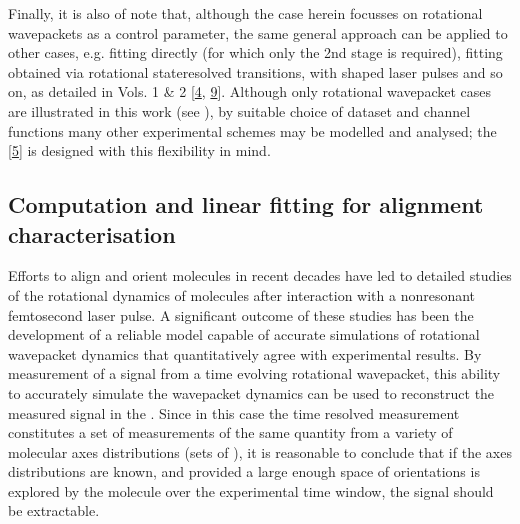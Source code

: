 \documentclass[letterpaper,table,10pt,english]{jupyterBook}
\begin{document}
\sphinxAtStartPar
Finally, it is also of note that, although the case herein focusses on rotational wavepackets as a control parameter, the same general approach can be applied to other cases, e.g. fitting {\hyperref[\detokenize{backmatter/glossary:term-MF}]{}} directly (for which only the 2nd stage is required), fitting {\hyperref[\detokenize{backmatter/glossary:term-PADs}]{}} obtained via rotational state\sphinxhyphen{}resolved transitions, with shaped laser pulses and so on, as detailed in  Vols. 1 \& 2 {[}\hyperlink{cite.backmatter/bibliography:id675}{4}, \hyperlink{cite.backmatter/bibliography:id676}{9}{]}. Although only rotational wavepacket cases are illustrated in this work (see {\hyperref[\detokenize{part2/extracting_matrix_elements_overview_270423:chpt-extracting-matrix-elements-overview}]{}}), by suitable choice of dataset and channel functions many other experimental schemes may be modelled and analysed; the  {[}\hyperlink{cite.backmatter/bibliography:id680}{5}{]} is designed with  this flexibility in mind.


\subsection{Computation and linear fitting for alignment characterisation}
\label{\detokenize{part1/numerics_070723:computation-and-linear-fitting-for-alignment-characterisation}}\label{\detokenize{part1/numerics_070723:sect-numerics-alignment-retrieval}}
\sphinxAtStartPar
Efforts to align and orient molecules in recent decades have led to detailed studies of the rotational dynamics of molecules after interaction with a non\sphinxhyphen{}resonant femtosecond laser pulse. A significant outcome of these studies has been the development of a reliable model capable of accurate simulations of rotational wavepacket dynamics that quantitatively agree with experimental results. By measurement of a signal from a time evolving rotational wavepacket, this ability to accurately simulate the wavepacket dynamics can be used to reconstruct the measured signal in the {\hyperref[\detokenize{backmatter/glossary:term-MF}]{}}. Since in this case the time resolved measurement constitutes a set of measurements of the same quantity from a variety of molecular axes distributions (sets of {\hyperref[\detokenize{backmatter/glossary:term-ADMs}]{}}), it is reasonable to conclude that if the axes distributions are known, and provided a large enough space of orientations is explored by the molecule over the experimental time window, the {\hyperref[\detokenize{backmatter/glossary:term-MF}]{}} signal should be extractable.
\end{document}

